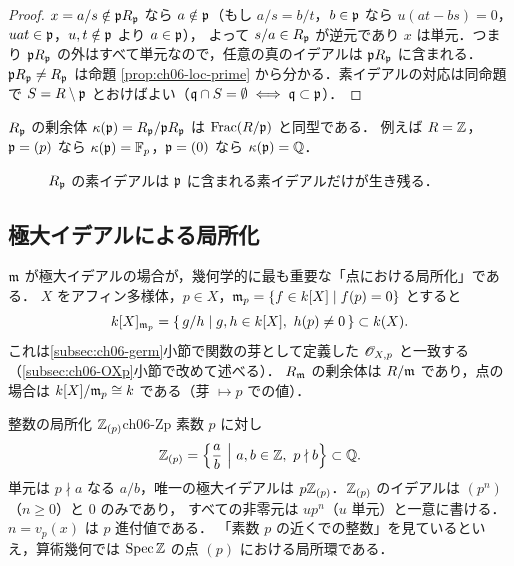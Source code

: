 \begin{proof}
$x=a/s\notin\mathfrak{p} R_{\mathfrak{p}}$ なら $a\notin\mathfrak{p}$（もし $a/s=b/t$，$b\in\mathfrak{p}$ なら $u(at-bs)=0$，$uat\in\mathfrak{p}$，$u,t\notin\mathfrak{p}$ より $a\in\mathfrak{p}$），
よって $s/a\in R_{\mathfrak{p}}$ が逆元であり $x$ は単元．つまり $\mathfrak{p} R_{\mathfrak{p}}$ の外はすべて単元なので，任意の真のイデアルは $\mathfrak{p} R_{\mathfrak{p}}$ に含まれる．
$\mathfrak{p} R_{\mathfrak{p}}\ne R_{\mathfrak{p}}$ は命題 \ref{prop:ch06-loc-prime} から分かる．素イデアルの対応は同命題で $S=R\setminus\mathfrak{p}$ とおけばよい（$\mathfrak{q}\cap S=\emptyset\iff\mathfrak{q}\subset\mathfrak{p}$）．
\end{proof}

$R_{\mathfrak{p}}$ の剰余体 $\kappa(\mathfrak{p})=R_{\mathfrak{p}}/\mathfrak{p} R_{\mathfrak{p}}$ は $\operatorname{Frac}(R/\mathfrak{p})$ と同型である．
例えば $R=\mathbb{Z}$，$\mathfrak{p}=(p)$ なら $\kappa(\mathfrak{p})=\mathbb{F}_p$，$\mathfrak{p}=(0)$ なら $\kappa(\mathfrak{p})=\mathbb{Q}$．

\begin{figure}[H]
\centering
{}
\caption{$R_{\mathfrak{p}}$ の素イデアルは $\mathfrak{p}$ に含まれる素イデアルだけが生き残る．}
\end{figure}

\subsection{極大イデアルによる局所化}

$\mathfrak{m}$ が極大イデアルの場合が，幾何学的に最も重要な「点における局所化」である．
$X$ をアフィン多様体，$p\in X$，$\mathfrak{m}_p=\{f\in k[X]\mid f(p)=0\}$ とすると
\[
  k[X]_{\m_p}=\{\,g/h\mid g,h\in k[X],\ h(p)\ne0\,\}\subset k(X).
\]
これは\ref{subsec:ch06-germ}小節で関数の芽として定義した $\mathscr{O}_{X,p}$ と一致する（\ref{subsec:ch06-OXp}小節で改めて述べる）．
$R_{\mathfrak{m}}$ の剰余体は $R/\mathfrak{m}$ であり，点の場合は $k[X]/\mathfrak{m}_p\cong k$ である（芽 $\mapsto p$ での値）．

\begin{myex}{整数の局所化 $\mathbb{Z}_{(p)}$}{ch06-Zp}
素数 $p$ に対し
\[
  \Z_{(p)}=\Bigl\{\frac ab\ \Big|\ a,b\in\Z,\ p\nmid b\Bigr\}\subset\Q .
\]
単元は $p\nmid a$ なる $a/b$，唯一の極大イデアルは $p\mathbb{Z}_{(p)}$．$\mathbb{Z}_{(p)}$ のイデアルは $(p^n)$（$n\ge0$）と $0$ のみであり，
すべての非零元は $u p^n$（$u$ 単元）と一意に書ける．$n=v_p(x)$ は $p$ 進付値である．
「素数 $p$ の近くでの整数」を見ているといえ，算術幾何では $\operatorname{Spec}\mathbb{Z}$ の点 $(p)$ における局所環である．
\end{myex}

